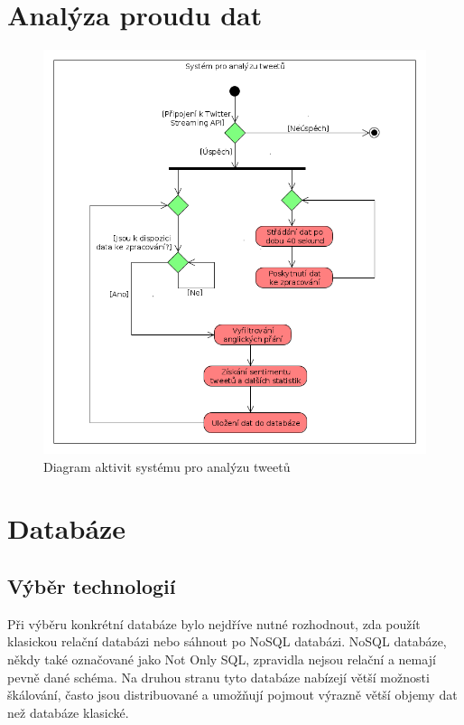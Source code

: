 \documentclass[thesis=B,czech]{FITthesis}[2012/06/26]
\begin{document}
\section{Analýza proudu dat}
\label{analysis-implementation}

	
\begin{figure}[ht]
   	\centering
   	\includegraphics[width=1\textwidth]{images/activity-diagram.png}
   	\caption{Diagram aktivit systému pro analýzu tweetů}
   	\label{fig:activity_diagram}
\end{figure}

\section{Databáze}
\subsection{Výběr technologií}
	Při výběru konkrétní databáze bylo nejdříve nutné rozhodnout, zda použít klasickou relační databázi nebo sáhnout po NoSQL databázi. NoSQL databáze, někdy také označované jako Not Only SQL, zpravidla nejsou relační a nemají pevně dané schéma. Na druhou stranu tyto databáze nabízejí větší možnosti škálování, často jsou distribuované a umožňují pojmout výrazně větší objemy dat než databáze klasické\cite{nosql-dbs}. 
	
\end{document}
